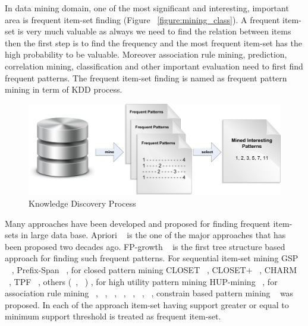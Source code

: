 In data mining domain, one of the most significant and interesting, important area is frequent item-set finding (Figure ~\ref{figure:mining_class}). A frequent item-set is very much valuable as always we need to find the relation between items then the first step is to find the frequency and the most frequent item-set has the high probability to be valuable. Moreover association rule mining, prediction, correlation mining, classification and other important evaluation need to first find frequent patterns. The frequent item-set finding is named as frequent pattern mining in term of KDD process.\\
\begin{figure}
\centering
  \includegraphics[width=.9\textwidth]{images/frequent_flow.jpg}
\caption{Knowledge Discovery Process}
\label{figure:frequent_flow}
\end{figure}
Many approaches have been developed and proposed for finding frequent item-sets in large data base. Apriori ~\cite{apriori} is the one of the major approaches that has been proposed two decades ago. FP-growth ~\cite{fp_growth} is the first tree structure based approach for finding such frequent patterns. For sequential item-set mining GSP ~\cite{gsp} , Prefix-Span ~\cite{prefix_span}, for closed pattern mining CLOSET ~\cite{closet}, CLOSET$+$ ~\cite{closet_plus}, CHARM ~\cite{charm}, TPF ~\cite{tpf}, others (~\cite{close_1}, ~\cite{close_2}) , for high utility pattern mining HUP-mining ~\cite{hup_mining}, for association rule mining ~\cite{ass_01}, ~\cite{ass_02}, ~\cite{ass_03}, ~\cite{ass_04}, ~\cite{ass_05}, ~\cite{ass_06}, ~\cite{ass_07}, constrain based pattern mining ~\cite{const_01} was proposed. In each of the approach item-set having support greater or equal to minimum support threshold is treated as frequent item-set.

